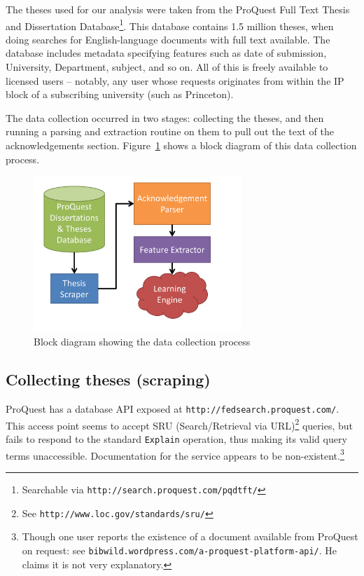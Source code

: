 The theses used for our analysis were taken from the ProQuest Full Text Thesis and Dissertation Database\footnote{Searchable via \texttt{http://search.proquest.com/pqdtft/}}. This database contains 1.5 million theses, when doing searches for English-language documents with full text available. The database includes metadata specifying features such as date of submission, University, Department, subject, and so on. All of this is freely available to licensed users -- notably, any user whose requests originates from within the IP block of a subscribing university (such as Princeton).

The data collection occurred in two stages: collecting the theses, and then running a parsing and extraction routine on them to pull out the text of the acknowledgements section.  Figure~\ref{fig:data_collect_block_diagram} shows a block diagram of this data collection process.

\begin{figure}
	\centering
	\includegraphics[width=0.7\textwidth]{block_diagram}
	\caption{Block diagram showing the data collection process}
	\label{fig:data_collect_block_diagram}
\end{figure}

\subsection*{Collecting theses (scraping)}
ProQuest has a database API exposed at \texttt{http://fedsearch.proquest.com/}. This access point seems to accept SRU (Search/Retrieval via URL)\footnote{See \texttt{http://www.loc.gov/standards/sru/}} queries, but fails to respond to the standard \texttt{Explain} operation, thus making its valid query terms unaccessible. Documentation for the service appears to be non-existent.\footnote{Though one user reports the existence of a document available from ProQuest on request: see \texttt{bibwild.wordpress.com/a-proquest-platform-api/}. He claims it is not very explanatory.}

